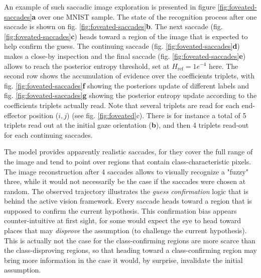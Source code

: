 \documentclass{article}
\begin{document}
An example of such saccadic image exploration is presented in figure \ref{fig:foveated-saccades}\textbf{a} over one MNIST sample.
The state of the recognition process after one saccade is shown on fig. \ref{fig:foveated-saccades}\textbf{b}. The next saccade (fig. \ref{fig:foveated-saccades}\textbf{c})  heads toward a region of the image that is expected to help confirm the guess. The continuing saccade (fig. \ref{fig:foveated-saccades}\textbf{d}) makes a close-by inspection and the final saccade (fig. \ref{fig:foveated-saccades}\textbf{e}) allows to reach the posterior entropy threshold, set at $H_\text{ref} = 1e^{-4}$ here. The second row shows the accumulation of evidence over the coefficients triplets, with fig. \ref{fig:foveated-saccades}\textbf{f} showing the posteriors update of different labels and fig. \ref{fig:foveated-saccades}\textbf{g} showing the posterior entropy update according to the coefficients triplets actually read. Note that several triplets are read for each end-effector position ($i,j$) (see fig. \ref{fig:foveated}c). There is for instance a total of 5 triplets read out at the initial gaze orientation (\textbf{b}), and then 4 triplets read-out for each continuing saccades.

The model provides apparently realistic saccades, for they cover the full range of the image and tend to point over regions that contain class-characteristic pixels. The image reconstruction after 4 saccades allows to visually recognize a "fuzzy" three, while it would not necessarily be the case if the saccades were chosen at random.
The observed trajectory illustrates the \emph{guess confirmation} logic that is behind the active vision framework. Every saccade heads toward a region that is supposed to confirm the current hypothesis. This confirmation bias appears counter-intuitive at first sight, for some would expect the eye to head toward places that may \emph{disprove} the assumption (to challenge the current hypothesis). This is actually not the case for the class-confirming regions are more scarce than the class-disproving regions, so that heading toward a class-confirming region may bring more information in the case it would, by surprise, invalidate the initial assumption.

\end{document}
